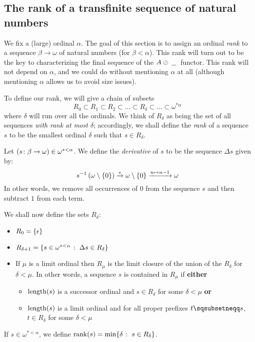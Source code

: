 \documentclass[11pt]{article} %
\begin{document}
\subsection{The rank of a transfinite sequence of natural numbers}

We fix a (large) ordinal $\alpha$.  The goal of this section is to assign an ordinal \emph{rank} to a sequence $\beta\to\omega$ of natural numbers (for $\beta<\alpha$).  This rank will turn out to be the key to characterizing the final sequence of the $A\oslash\;\underline{\hspace{1.5ex}}\;$ functor.  This rank will not depend on $\alpha$, and we could do without mentioning $\alpha$ at all (although mentioning $\alpha$ allows us to avoid size issues).  

To define our rank, we will give a chain of subsets 
\[
  R_0\subset R_1\subset R_2\subset\dots \subset R_\delta \subset\dots \subset \omega^{*\alpha}
  \]
where $\delta$ will run over all the ordinals.  We think of $R_\delta$ as being the set of all sequences \emph{with rank at most $\delta$}; accordingly, we shall define the \emph{rank} of a sequence $s$ to be the smallest ordinal $\delta$ such that $s\in R_\delta$.  

\begin{definition}
  Let $(s\colon\beta\to\omega)\in\omega^{*<\alpha}$.  We define the \emph{derivative} of $s$ to be the sequence $\Delta s$ given by:
  \[
    s^{-1}\left(\omega\setminus\{0\}\right) \xrightarrow{s} \omega\setminus\{0\} \xrightarrow{n\mapsto n-1} \omega
    \]
  In other words, we remove all occurrences of $0$ from the sequence $s$ and then subtract $1$ from each term.  
\end{definition}

We shall now define the sets $R_\delta$:
\begin{definition}
  \begin{itemize}
    \item $R_0=\{\epsilon\}$
    \item $R_{\delta+1}=\left\{s\in\omega^{*<\alpha}\;\colon\; \Delta s\in R_\delta\right\}$
    \item If $\mu$ is a limit ordinal then $R_\mu$ is the limit closure of the union of the $R_\delta$ for $\delta<\mu$.  In other words, a sequence $s$ is contained in $R_\mu$ if \textbf{either}
      \begin{itemize}
        \item $\operatorname{length}(s)$ is a successor ordinal and $s\in R_\delta$ for some $\delta<\mu$ \textbf{or}
        \item $\operatorname{length}(s)$ is a limit ordinal and for all proper prefixes $t\pprefix s$, $t\in R_\delta$ for some $\delta<\mu$
      \end{itemize}
  \end{itemize}

  If $s\in\omega^{*<\alpha}$, we define $\operatorname{rank}(s) = \min\{\delta\;\colon\; s\in R_\delta\}$.
\end{definition}
\end{document}
